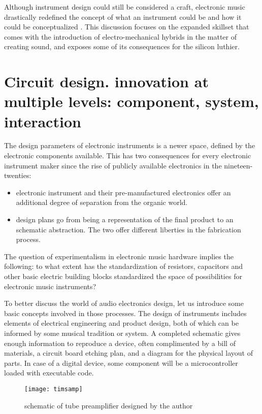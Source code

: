 	Although instrument design could still be considered a craft, electronic music drastically redefined the concept of what an instrument could be and how it could be conceptualized \cite{pinch2002}. This discussion focuses on the expanded skillset that comes with the introduction of electro-mechanical hybrids in the matter of creating sound, and exposes some of its consequences for the silicon luthier. 

\section{Circuit design. innovation at multiple levels: component, system, interaction}

The design parameters of electronic instruments is a newer space, defined by the electronic components available. This has two consequences for every electronic instrument maker since the rise of publicly available electronics in the nineteen-twenties:

\begin{itemize}
	\item electronic instrument and their pre-manufactured electronics offer an additional degree of separation from the organic world. 
	\item design plans go from being a representation of the final product to an schematic abstraction. The two offer different liberties in the fabrication process.
\end{itemize}
	
The question of experimentalism in electronic music hardware implies the following: to what extent has the standardization of resistors, capacitors and other basic electric building blocks standardized the space of possibilities for electronic music instruments?

To better discuss the world of audio electronics design, let us introduce some basic concepts involved in those processes. The design of instruments includes elements of electrical engineering and product design, both of which can be informed by some musical tradition or system. A completed schematic gives enough information to reproduce a device, often complimented by a bill of materials, a circuit board etching plan, and a diagram for the physical layout of parts. In case of a digital device, some component will be a microcontroller loaded with executable code. 

\begin{figure}[h!]
  \caption{schematic of tube preamplifier designed by the author}
  \centering
    \texttt{[image: timsamp]}
\end{figure}

